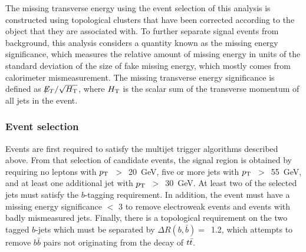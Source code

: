 
The missing transverse energy using the event selection of this analysis is constructed using topological clusters that have been corrected according to the object that they are associated with.
To further separate signal events from background, this analysis considers a quantity known as the missing energy significance, which measures the relative amount of missing energy in units of the standard deviation of the size of fake missing energy, which mostly comes from calorimeter mismeasurement.
The missing transverse energy significance is defined as $\not\!\!{E_{T}}/ \sqrt{H_{\mathrm{T}}}$, where $H_{\mathrm{T}}$ is the scalar sum of the transverse momentum of all jets in the event.



\subsubsection{Event selection}
\label{subsec:EvSel}

Events are first required to satisfy the multijet trigger algorithms described above.
From that selection of candidate events, the signal region is obtained by requiring no leptons with $p_{\rm T}$~$>$~20~GeV, 
five or more jets with $p_{\rm T}$~$>$~55~GeV, and at least one additional jet with $p_{\rm T}$~$>$~30~GeV.
At least two of the selected jets must satisfy the $b$-tagging requirement.
In addition, the event must have a missing energy significance $<$ 3 to remove electroweak events and events with badly mismeasured jets.
Finally, there is a topological requirement on the two tagged $b$-jets which must be separated by $\Delta R(b,\bar{b}) =$~1.2, 
which attempts to remove $b\bar{b}$ pairs not originating from the decay of $t\bar{t}$.

